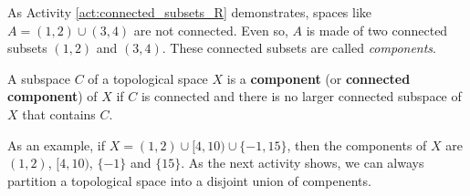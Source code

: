 \begin{comment}

\ActivitySolution

\ba
\item Suppose $U$ and $V$ form a separation of $A$. Then $U \cap A $ is not empty, so $ U \cap A = \{a\}$. Similarly, $V \cap A = \{a\}$. So $U \cap V \cap A = \{a\}$ isn't empty. This contradicts the assumption that $U$ and $V$ form a separation of $A$. We conclude that $A$ is connected.  

\item Let $U = (-\infty, c)$ and $V = (c, \infty)$. Since $c \notin A$, $A \subseteq (U \cup V)$. By definition, $A \cap U \cap V = \emptyset$, $A \cap U \neq \emptyset$, and $A \cap V \neq \emptyset$. So $U$ and $V$ form a separation of $A$ and $A$ is not connected. 

\item The connected subsets of $\R$ are the intervals and the single point sets. 

\ea

\end{comment}

\label{sec_components}

As Activity \ref{act:connected_subsets_R} demonstrates, spaces like $A = (1,2) \cup (3,4)$ are not connected. Even so, $A$ is made of two connected subsets $(1,2)$ and $(3,4)$. These connected subsets are called \emph{components}.

\begin{definition} A subspace $C$ of a topological space $X$ is a \textbf{component} (or \textbf{connected component}) of $X$ if $C$ is connected and there is no larger connected subspace of $X$ that contains $C$.
\end{definition}

As an example, if $X = (1,2) \cup [4,10) \cup \{-1,15\}$, then the components of $X$ are $(1,2)$, $[4,10)$, $\{-1\}$ and $\{15\}$. As the next activity shows, we can always partition a topological space into a disjoint union of compenents.

